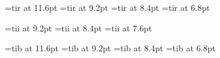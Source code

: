 





\font\twelverm=tir at 11.6pt
\font\ninerm=tir at 9.2pt
\font\eightrm=tir at 8.4pt
\font\sixrm=tir at 6.8pt	%

\font\nineit=tii at 9.2pt
\font\eightit=tii at 8.4pt	%
\font\sevenit=tii at 7.6pt	%

\font\twelvebf=tib at 11.6pt
\font\ninebf=tib at 9.2pt
\font\eightbf=tib at 8.4pt	%
\font\sixbf=tib at 6.8pt	%

